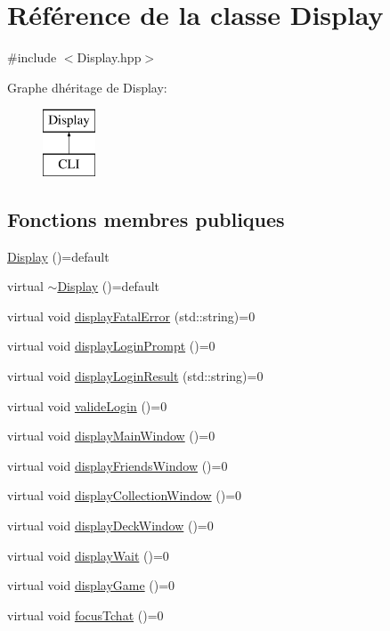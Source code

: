 \hypertarget{classDisplay}{}\section{Référence de la classe Display}
\label{classDisplay}


{\ttfamily \#include $<$Display.\+hpp$>$}

Graphe d\textquotesingle{}héritage de Display\+:\begin{figure}[H]
\begin{center}
\leavevmode
\includegraphics[height=2.000000cm]{classDisplay}
\end{center}
\end{figure}
\subsection*{Fonctions membres publiques}
\begin{DoxyCompactItemize}
\item 
\hyperlink{classDisplay_a46094310ba411f6fea561f799c4d0754}{Display} ()=default
\item 
virtual \hyperlink{classDisplay_a8c364e5ed02f311a695e9502773d1c74}{$\sim$\+Display} ()=default
\item 
virtual void \hyperlink{classDisplay_a9d41e789d52a29d773d7acddd9f01172}{display\+Fatal\+Error} (std\+::string)=0
\item 
virtual void \hyperlink{classDisplay_a55719ab539ee6cc803d9de74b05f8e38}{display\+Login\+Prompt} ()=0
\item 
virtual void \hyperlink{classDisplay_ac4cc71c734feea0099bbeae89e6d2f1c}{display\+Login\+Result} (std\+::string)=0
\item 
virtual void \hyperlink{classDisplay_a93154cf71b945b6ce3ef959a306629f2}{valide\+Login} ()=0
\item 
virtual void \hyperlink{classDisplay_a88a6e0ccafb0ef286149a9ab4ffb28ad}{display\+Main\+Window} ()=0
\item 
virtual void \hyperlink{classDisplay_ae80aee2a7bd67135e1756ba439946f8f}{display\+Friends\+Window} ()=0
\item 
virtual void \hyperlink{classDisplay_afb3efa4573ae41c513df30ba4c2691c0}{display\+Collection\+Window} ()=0
\item 
virtual void \hyperlink{classDisplay_adbf8168f368a98a4c7797519e9b39948}{display\+Deck\+Window} ()=0
\item 
virtual void \hyperlink{classDisplay_ae3bff36aaa0be0e78b2df88c9b326138}{display\+Wait} ()=0
\item 
virtual void \hyperlink{classDisplay_af3d6e09060fc88351d0c0bf3d349770c}{display\+Game} ()=0
\item 
virtual void \hyperlink{classDisplay_a66a03431e0f33d30d914b7b3decc0103}{focus\+Tchat} ()=0
\end{DoxyCompactItemize}


